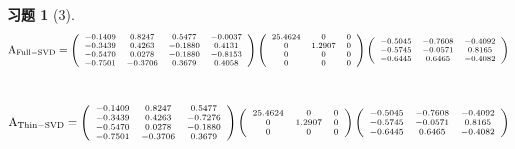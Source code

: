 \documentclass[12pt, oneside]{article}
\newtheorem*{exercise}{\textbf{习题}}
\begin{document}
\begin{exercise}[3]
	\begin{equation*}
		\scriptsize
		\rm{
			A_{Full-SVD} =
			\left(
			\begin{array}{cccc}
				-0.1409 & 0.8247  & 0.5477  & -0.0037 \\
				-0.3439 & 0.4263  & -0.1880 & 0.4131  \\
				-0.5470 & 0.0278  & -0.1880 & -0.8153 \\
				-0.7501 & -0.3706 & 0.3679  & 0.4058  \\
			\end{array}
			\right)
			\left(
			\begin{array}{ccc}
				25.4624 & 0      & 0 \\
				0       & 1.2907 & 0 \\
				0       & 0      & 0 \\
				0       & 0      & 0 \\
			\end{array}
			\right)
			\left(
			\begin{array}{ccc}
				-0.5045 & -0.7608 & -0.4092 \\
				-0.5745 & -0.0571 & 0.8165  \\
				-0.6445 & 0.6465  & -0.4082 \\
			\end{array}
			\right)
		}
	\end{equation*} \\
	\begin{equation*}
		\scriptsize
		\rm{
			A_{Thin-SVD} =
			\left(
			\begin{array}{ccc}
				-0.1409 & 0.8247  & 0.5477  \\
				-0.3439 & 0.4263  & -0.7276 \\
				-0.5470 & 0.0278  & -0.1880 \\
				-0.7501 & -0.3706 & 0.3679  \\
			\end{array}
			\right)
			\left(
			\begin{array}{ccc}
				25.4624 & 0      & 0 \\
				0       & 1.2907 & 0 \\
				0       & 0      & 0 \\
			\end{array}
			\right)
			\left(
			\begin{array}{ccc}
				-0.5045 & -0.7608 & -0.4092 \\
				-0.5745 & -0.0571 & 0.8165  \\
				-0.6445 & 0.6465  & -0.4082 \\
			\end{array}
			\right)
		}
	\end{equation*}
\end{exercise}
\end{document}
